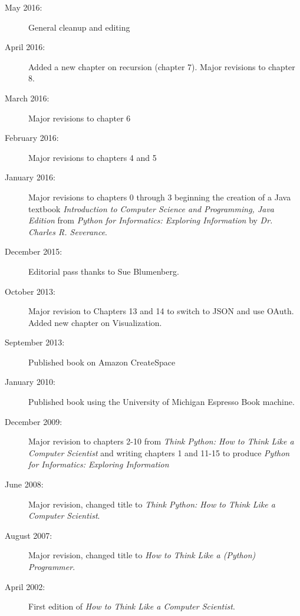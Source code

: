 \begin{latexonly}
{\begin{description}
\item[May 2016:] General cleanup and editing

\item[April 2016:] Added a new chapter on recursion (chapter 7). Major revisions to chapter 8.

\item[March 2016:] Major revisions to chapter 6

\item[February 2016:] Major revisions to chapters 4 and 5

\item[January 2016:] Major revisions to chapters 0 through 3 beginning the creation of a Java textbook \emph{Introduction to Computer Science and Programming, Java Edition} from \emph{Python for Informatics: Exploring Information} by \emph{Dr. Charles R. Severance}.

\item[December 2015:] Editorial pass thanks to Sue Blumenberg.

\item[October 2013:] Major revision to Chapters 13 and 14
to switch to JSON and use OAuth.
Added new chapter on Visualization.

\item[September 2013:] Published book on Amazon CreateSpace

\item[January 2010:] Published book using the University of 
Michigan Espresso Book machine.

\item[December 2009:] Major revision to chapters 2-10 from
\emph{Think Python: How to Think Like
a Computer Scientist}
and writing chapters 1 and 11-15 to
produce 
\emph{Python for Informatics: Exploring Information}

\item[June 2008:] Major revision, changed title to
\emph{Think Python: How to Think Like
a Computer Scientist}.

\item[August 2007:] Major revision, changed title to
\emph{How to Think Like a (Python) Programmer}.

\item[April 2002:] First edition of \emph{How to Think Like
a Computer Scientist}.

\end{description}

\vspace{0.2in}

}
\end{latexonly}
